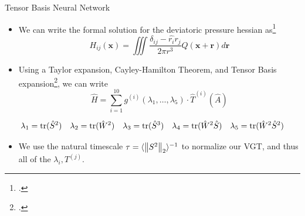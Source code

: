 \begin{frame}{Tensor Basis Neural Network}
  \begin{itemize}
  \item We can write the formal solution for the deviatoric pressure hessian as\footcite{ohkitani1995}
    \begin{equation}
      H_{ij}(\textbf{x}) = \iiint \frac{\delta_{ij} - \hat{r_i}\hat{r_j}}{2\pi r^3}Q(\textbf{x} + \textbf{r})d\textbf{r}
    \end{equation}
  \item Using a Taylor expansion, Cayley-Hamilton Theorem, and Tensor Basis expansion\footcite{pope1975}, we can write
    \begin{equation}
      \hat{H} = \sum_{i=1}^{10} g^{(i)}(\lambda_1, \dots, \lambda_5)\cdot \hat{T}^{(i)}(\hat{A})
    \end{equation}
  \end{itemize}

  \begin{small}
    \begin{equation*}
      \lambda_1 = \text{tr}(\hat{S}^2) \quad \lambda_2 = \text{tr}(\hat{W}^2) \quad \lambda_3 = \text{tr}(\hat{S}^3) \quad \lambda_4 = \text{tr}(\hat{W}^2\hat{S}) \quad \lambda_5 = \text{tr}(\hat{W}^2\hat{S}^2)
    \end{equation*}
  \end{small}

  \begin{itemize}
  \item We use the natural timescale $\tau = \langle \left\lVert S^2\right\rVert_2 \rangle^{-1}$ to normalize our VGT, and thus all of the $\lambda_i, T^{(j)}$.
  \end{itemize}
\end{frame}

